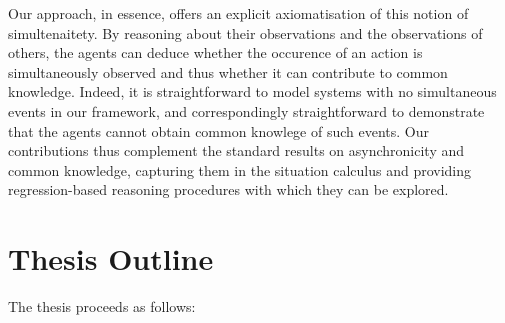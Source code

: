 Our approach, in essence, offers an explicit axiomatisation of this
notion of simultenaitety. By reasoning about their observations and
the observations of others, the agents can deduce whether the occurence
of an action is simultaneously observed and thus whether it can contribute
to common knowledge. Indeed, it is straightforward to model systems
with no simultaneous events in our framework, and correspondingly
straightforward to demonstrate that the agents cannot obtain common
knowlege of such events. Our contributions thus complement the standard
results on asynchronicity and common knowledge, capturing them in
the situation calculus and providing regression-based reasoning procedures
with which they can be explored.

\newpage{}


\section{Thesis Outline}

The thesis proceeds as follows:

